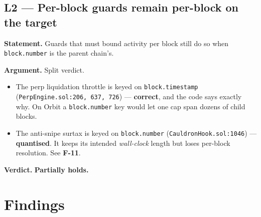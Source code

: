 \documentclass[11pt,a4paper]{article}
\newcommand{\code}[1]{\texttt{\small #1}}
\newcommand{\fileref}[1]{\texttt{\scriptsize #1}}
\begin{document}
\subsection*{L2 --- Per-block guards remain per-block on the target}
\textbf{Statement.} Guards that must bound activity per block still do so when
\code{block.number} is the parent chain's.

\textbf{Argument.} Split verdict.
\begin{itemize}
\item The perp liquidation throttle is keyed on \code{block.timestamp}
(\fileref{PerpEngine.sol:206, 637, 726}) --- \textbf{correct}, and the code says
exactly why. On Orbit a \code{block.number} key would let one cap span dozens of
child blocks.
\item The anti-snipe surtax is keyed on \code{block.number}
(\fileref{CauldronHook.sol:1046}) --- \textbf{quantised}. It keeps its intended
\emph{wall-clock} length but loses per-block resolution. See \textbf{F-11}.
\end{itemize}

\textbf{Verdict.} \textcolor{medium}{\textbf{Partially holds.}}

\newpage
\section{Findings}
\label{sec:findings}
\end{document}
